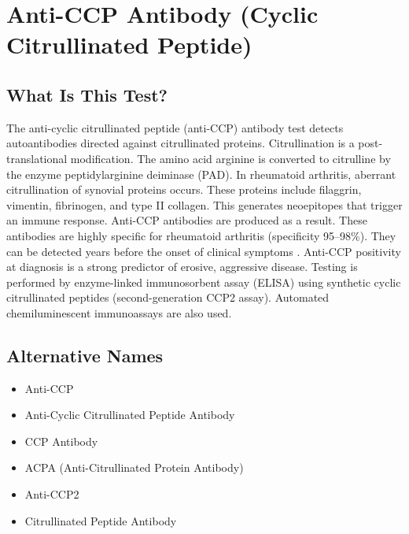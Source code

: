 \chapter{Anti-CCP Antibody (Cyclic Citrullinated Peptide)}

\section*{What Is This Test?}
The anti-cyclic citrullinated peptide (anti-CCP) antibody test detects autoantibodies directed against citrullinated proteins. Citrullination is a post-translational modification. The amino acid arginine is converted to citrulline by the enzyme peptidylarginine deiminase (PAD). In rheumatoid arthritis, aberrant citrullination of synovial proteins occurs. These proteins include filaggrin, vimentin, fibrinogen, and type II collagen. This generates neoepitopes that trigger an immune response. Anti-CCP antibodies are produced as a result. These antibodies are highly specific for rheumatoid arthritis (specificity 95--98\%). They can be detected years before the onset of clinical symptoms \cite{vanvenrooij2011}. Anti-CCP positivity at diagnosis is a strong predictor of erosive, aggressive disease. Testing is performed by enzyme-linked immunosorbent assay (ELISA) using synthetic cyclic citrullinated peptides (second-generation CCP2 assay). Automated chemiluminescent immunoassays are also used.

\section*{Alternative Names}
\begin{itemize}
  \item Anti-CCP
  \item Anti-Cyclic Citrullinated Peptide Antibody
  \item CCP Antibody
  \item ACPA (Anti-Citrullinated Protein Antibody)
  \item Anti-CCP2
  \item Citrullinated Peptide Antibody
\end{itemize}

